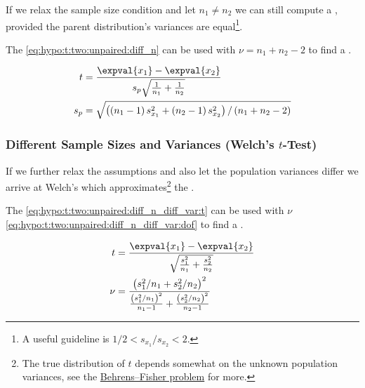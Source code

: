 If we relax the sample size condition and let $n_{1} \neq n_{2}$
we can still compute a \tstat,
provided the parent distribution's variances are equal\footnote{A useful guideline is $1/2 < s_{x_{1}} / s_{x_{2}} < 2$.}.

The \tstat \cref{eq:hypo:t:two:unpaired:diff_n} can be used with $\nu = n_{1} + n_{2} - 2$ to find a \pvalue.

\begin{subequations}\label{eq:hypo:t:two:unpaired:diff_n}
\begin{align}
t &= \frac{\expval{x_{1}} - \expval{x_{2}}}{s_{p} \sqrt{\frac{1}{n_{1}} + \frac{1}{n_{2}}}} \label{eq:hypo:t:two:unpaired:diff_n:t} \\
s_{p} &= \sqrt{\left(\left(n_{1} - 1\right)s^{2}_{x_{1}} + \left(n_{2} - 1\right)s^{2}_{x_{2}}\right)/\left(n_{1} + n_{2} -2\right)} \label{eq:hypo:t:two:unpaired:diff_n:s_p}
\end{align}
\end{subequations}

\subsubsection{Different Sample Sizes and Variances (Welch's \texorpdfstring{$t$}{t}-Test)}
\label{hypo:t_test:two:unpaired:diff_n_diff_var}

If we further relax the assumptions and also let the population variances differ
we arrive at Welch's \ttest which approximates\footnote{The
true distribution of $t$ depends somewhat on the unknown population variances,
see the \href{https://en.wikipedia.org/wiki/Behrens\%E2\%80\%93Fisher_problem}{Behrens--Fisher problem}
for more.} the \tdist.

The \tstat \cref{eq:hypo:t:two:unpaired:diff_n_diff_var:t} can be used with $\nu$ \cref{eq:hypo:t:two:unpaired:diff_n_diff_var:dof} to find a \pvalue.

\begin{subequations}\label{eq:hypo:t:two:unpaired:diff_n_diff_var}
\begin{align}
t &= \frac{\expval{x_{1}} - \expval{x_{2}}}{\sqrt{\frac{s^{2}_{1}}{n_{1}} + \frac{s^{2}_{2}}{n_{2}}}} \label{eq:hypo:t:two:unpaired:diff_n_diff_var:t} \\
\nu &= \frac{\left(s^{2}_{1}/n_{1} + s^{2}_{2}/n_{2}\right)^{2}}{\frac{\left(s^{2}_{1}/n_{1}\right)^{2}}{n_{1}-1} + \frac{\left(s^{2}_{2}/n_{2}\right)^{2}}{n_{2}-1}} \label{eq:hypo:t:two:unpaired:diff_n_diff_var:dof}
\end{align}
\end{subequations}

